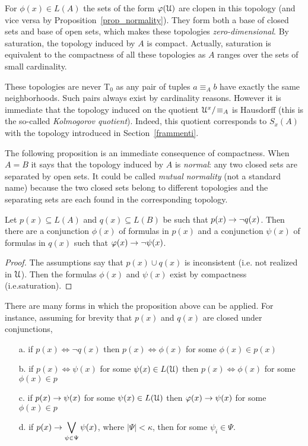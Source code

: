 For $\phi(x)\in L(A)$ the sets of the form $\varphi(\EuScript U)$ are clopen in this topology (and vice versa by Proposition~\ref{prop_normality}).
They form both a base of closed sets and base of open sets, which makes these topologies \textit{zero-dimensional}.
By saturation, the topology induced by $A$ is compact.
Actually, saturation is equivalent to the compactness of all these topologies as $A$ ranges over the sets of small cardinality.

These topologies are never T$_0$ as any pair of tuples $a\equiv_A b$ have exactly the same neighborhoods. Such pairs always exist by cardinality reasons. However it is immediate that the topology induced on the quotient $\EuScript U^{x}/\!\equiv_A$ is Hausdorff (this is the so-called \textit{Kolmogorov quotient}). Indeed, this quotient corresponds to $S_x(A)$ with the topology introduced in Section~\ref{frammenti}.

The following proposition is an immediate consequence of compactness. When $A=B$ it says that the topology induced by $A$ is \textit{normal}: any two closed sets are separated by open sets. It could be called \emph{mutual normality\/} (not a standard name) because the two closed sets belong to different topologies and the separating sets are each found in the corresponding topology.


\begin{proposition}\label{prop_normality}
Let $p(x)\subseteq L(A)$ and $q(x)\subseteq L(B)$ be such that $p(x)\rightarrow \neg q(x)$.
Then there are a conjunction $\phi(x)$ of formulas in $p(x)$ and a conjunction $\psi(x)$ of formulas in $q(x)$ such that $\varphi(x)\rightarrow\neg\psi(x)$.
\end{proposition}

\begin{proof}
The assumptions say that $p(x)\cup q(x)$ is inconsistent (i.e. not realized in $\EuScript U$). Then the formulas $\phi(x)$ and $\psi(x)$ exist by compactness (i.e.\@ saturation).
\end{proof}

\begin{remark}\label{rem_normality}There are many forms in which the proposition above can be applied. For instance, assuming for brevity that $p(x)$ and $q(x)$ are closed under conjunctions,
\begin{itemize}
\item[a.] if $p(x)\iff\neg q(x)$ then $p(x)\iff\phi(x)$ for some $\phi(x)\in p(x)$\smallskip
\item[b.] if $\displaystyle p(x)\iff\psi(x)$ for some $\psi(x)\in L(\EuScript U)$ then $p(x)\iff\phi(x)$ for some $\phi(x)\in p$\smallskip
\item[c.] if $\displaystyle p(x)\rightarrow\psi(x)$ for some $\psi(x)\in L(\EuScript U)$ then $\varphi(x)\rightarrow\psi(x)$ for some $\phi(x)\in p$\smallskip
\item[d.] if $\displaystyle p(x)\rightarrow\bigvee_{\psi\in\Psi}\psi(x)$, where $|\Psi|<\kappa$,  then  for some $\psi_i\in\Psi$.
\end{itemize}
\end{remark}

